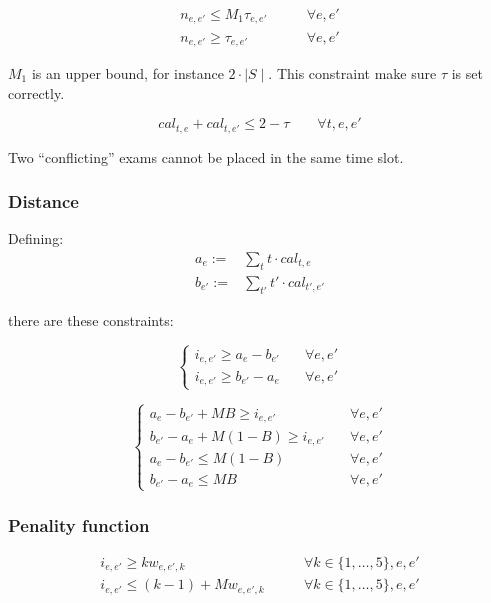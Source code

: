 \documentclass[11pt, a4paper, leqno]{article}
\begin{document}
	\begin{align*}
		n_{e,e'} \leq M_1\tau_{e,e'} &\qquad \forall e,e' \\
		n_{e,e'} \geq \tau_{e,e'} &\qquad \forall e,e'
	\end{align*}
	
	$M_1$ is an upper bound, for instance $2\cdot\mid S\mid$. This constraint make sure $\tau$ is set correctly.

	\[
		cal_{t,e}+cal_{t,e'} \leq 2 - \tau \qquad \forall t,e,e'
	\]
	
	Two ``conflicting'' exams cannot be placed in the same time slot.
	
	\subsubsection{Distance}
	
	Defining:
	\begin{align*}
		a_e :=& \sum_{t} t\cdot cal_{t,e} \\
		b_{e'} :=& \sum_{t'} t'\cdot cal_{t',e'}
	\end{align*}
	
	there are these constraints:
	
	\[
	\begin{cases}
		i_{e,e'} \geq a_e-b_{e'}&\quad \forall e,e'\\
		i_{e,e'} \geq b_{e'}-a_e&\quad \forall e,e'
	\end{cases}
	\]
	
	
	
	\[
	\begin{cases}
	a_e-b_{e'} + MB \geq i_{e,e'}&\quad \forall e,e'\\
	b_{e'}-a_e + M(1-B) \geq i_{e,e'}&\quad \forall e,e'\\
	a_e-b_{e'} \leq M(1-B)&\quad \forall e,e'\\
	b_{e'}-a_e \leq MB&\quad \forall e,e'
	\end{cases}
	\]
	
	\subsubsection{Penality function}
	
	\begin{align*}
		i_{e,e'} \geq k w_{e,e',k} &\qquad\forall k \in \{1,\dots,5\},e,e'\\
		i_{e,e'} \leq (k-1) + M  w_{e,e',k} &\qquad\forall k \in \{1,\dots,5\},e,e'
	\end{align*}
	
\end{document}
